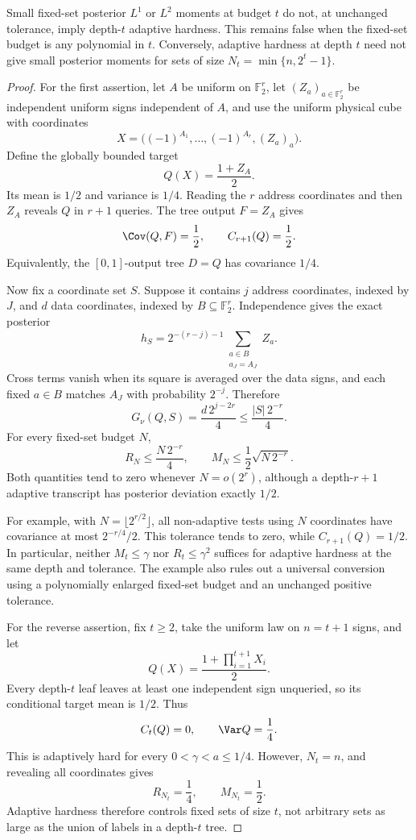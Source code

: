 \begin{proposition}\label{ian:adaptive-fixed-set-counterexamples}
Small fixed-set posterior \(L^1\) or \(L^2\) moments at budget \(t\) do not, at unchanged tolerance, imply depth-\(t\) adaptive hardness. This remains false when the fixed-set budget is any polynomial in \(t\). Conversely, adaptive hardness at depth \(t\) need not give small posterior moments for sets of size \(N_t=\min\{n,2^t-1\}\).
\end{proposition}
\begin{proof}
For the first assertion, let \(A\) be uniform on \(\mathbb F_2^r\), let
\((Z_a)_{a\in\mathbb F_2^r}\) be independent uniform signs independent of \(A\), and use the uniform physical cube with coordinates
\[
 X=\bigl((-1)^{A_1},\ldots,(-1)^{A_r},(Z_a)_a\bigr).
\]
Define the globally bounded target
\[
 Q(X)=\frac{1+Z_A}{2}.
\]
Its mean is \(1/2\) and variance is \(1/4\). Reading the \(r\) address coordinates and then \(Z_A\) reveals \(Q\) in \(r+1\) queries. The tree output \(F=Z_A\) gives
\[
 \Cov(Q,F)=\frac12,\qquad C_{r+1}(Q)=\frac12.
\]
Equivalently, the \([0,1]\)-output tree \(D=Q\) has covariance \(1/4\).

Now fix a coordinate set \(S\). Suppose it contains \(j\) address coordinates, indexed by \(J\), and \(d\) data coordinates, indexed by \(B\subseteq\mathbb F_2^r\). Independence gives the exact posterior
\[
 h_S
 =
 2^{-(r-j)-1}
 \sum_{\substack{a\in B\\a_J=A_J}}Z_a.
\]
Cross terms vanish when its square is averaged over the data signs, and each fixed \(a\in B\) matches \(A_J\) with probability \(2^{-j}\). Therefore
\[
 G_\nu(Q,S)=\frac{d\,2^{j-2r}}4
 \le\frac{|S|\,2^{-r}}4.
\]
For every fixed-set budget \(N\),
\[
 R_N\le\frac{N\,2^{-r}}4,
 \qquad
 M_N\le\frac12\sqrt{N\,2^{-r}}.
\]
Both quantities tend to zero whenever \(N=o(2^r)\), although a depth-\(r+1\) adaptive transcript has posterior deviation exactly \(1/2\).

For example, with \(N=\lfloor2^{r/2}\rfloor\), all non-adaptive tests using \(N\) coordinates have covariance at most
\(2^{-r/4}/2\). This tolerance tends to zero, while
\(C_{r+1}(Q)=1/2\). In particular, neither \(M_t\le\gamma\) nor
\(R_t\le\gamma^2\) suffices for adaptive hardness at the same depth and tolerance. The example also rules out a universal conversion using a polynomially enlarged fixed-set budget and an unchanged positive tolerance.

For the reverse assertion, fix \(t\ge2\), take the uniform law on \(n=t+1\) signs, and let
\[
 Q(X)=\frac{1+\prod_{i=1}^{t+1}X_i}{2}.
\]
Every depth-\(t\) leaf leaves at least one independent sign unqueried, so its conditional target mean is \(1/2\). Thus
\[
 C_t(Q)=0,\qquad \Var Q=\frac14.
\]
This is adaptively hard for every \(0<\gamma<a\le1/4\). However,
\(N_t=n\), and revealing all coordinates gives
\[
 R_{N_t}=\frac14,\qquad M_{N_t}=\frac12.
\]
Adaptive hardness therefore controls fixed sets of size \(t\), not arbitrary sets as large as the union of labels in a depth-\(t\) tree.
\end{proof}

